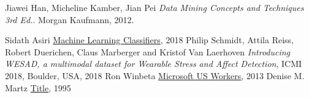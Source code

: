 \newpage

\begin{thebibliography}{9}
	Jiawei Han, Micheline Kamber, Jian Pei
	\textit{Data Mining Concepts and Techniques 3rd Ed.}. 
	Morgan Kaufmann, 2012.

	Sidath Asiri
	\href{https://towardsdatascience.com/machine-learning-classifiers-a5cc4e1b0623}{Machine Learning Classifiers},
	2018
	Philip Schmidt, Attila Reiss, Robert Duerichen, Claus Marberger and Kristof Van Laerhoven
	\textit{Introducing WESAD, a multimodal dataset for Wearable Stress and Affect Detection}, 
	ICMI 2018, Boulder, USA, 2018
	Ron Winbeta
	\href{https://www.onmsft.com/news/microsoft-us-workers-spend-7-hours-computer-day-average}{Microsoft US Workers},
	2013
	Denise M. Martz
	\href{https://onlinelibrary.wiley.com/doi/abs/10.1111/j.1471-6402.1995.tb00088.x}{Title},
	1995
\end{thebibliography}
